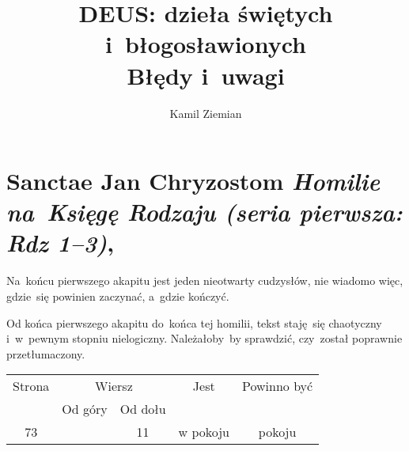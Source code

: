 \documentclass[a4paper,11pt]{article}
\title{DEUS: dzieła świętych i~błogosławionych \\
  {\Large Błędy i~uwagi}}
\author{Kamil Ziemian}
\numberwithin{equation}{section}
\begin{document}





\maketitle





\section{Sanctae Jan Chryzostom
  \textit{Homilie na~Księgę Rodzaju (seria pierwsza: Rdz 1--3)},
  \parencite{SancteJanChryzostomHomKsiegaRodzaju2008}}




\vspace{0em}


\noindent
{} Na~końcu pierwszego akapitu jest jeden nieotwarty
cudzysłów, nie wiadomo więc, gdzie~się powinien zaczynać, a~gdzie
kończyć.

\VerSpaceFour





\noindent
{} Od końca pierwszego akapitu do~końca tej homilii,
tekst staję~się chaotyczny i~w~pewnym stopniu nielogiczny.
Należałoby~by sprawdzić, czy~został poprawnie przetłumaczony.






\VerSpaceFive


\begin{center}

  \begin{tabular}{|c|c|c|c|c|}
    \hline
    Strona & \multicolumn{2}{c|}{Wiersz} & Jest
                              & Powinno być \\ \cline{2-3}
    & Od góry & Od dołu & & \\
    \hline
    73 & & 11 & w pokoju & pokoju \\
    \hline
  \end{tabular}

\end{center}
\end{document}
